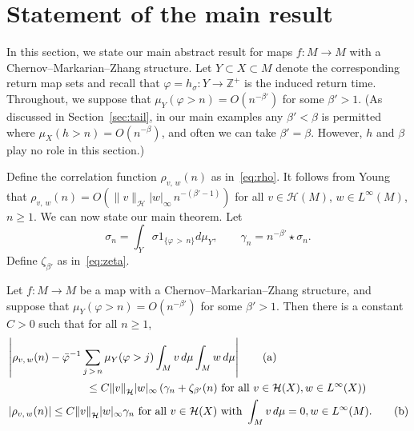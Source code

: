\documentclass[AHL,Unicode,longabstracts,published]{cedram}
\newcommand{\Z}{\mathbb{Z}}
\newcommand{\cH}{\mathcal{H}}
\newcommand{\bvarphi}{\bar{\varphi}}
\newcommand*{\alphenumi}{\renewcommand*{\theenumi}{\alph{enumi}}}
\begin{document}
\section{Statement of the main result}\label{sec:main}

In this section, we state our main abstract result for maps $f:M\to M$ with a Chernov--Markarian--Zhang structure. Let $Y\subset X\subset M$ denote the corresponding return map sets and recall that $\varphi=h_\sigma:Y\to\Z^+$ is the induced return time. Throughout, we suppose that $\mu_Y(\varphi>n)=O(n^{-\beta'})$ for some $\beta'>1$. (As discussed in Section~\ref{sec:tail}, in our main examples any $\beta'<\beta$ is permitted where $\mu_X(h>n)=O(n^{-\beta})$, and often we can take $\beta'=\beta$. However, $h$ and $\beta$ play no role in this section.)



Define the correlation function $\rho_{v,\,w}(n)$ as in~\eqref{eq:rho}. It follows from Young~\cite{Young99} that $\rho_{v,\,w}(n)=O(\|v\|_\cH |w|_\infty\, n^{-(\beta'-1)})$ for all $v\in\cH(M)$, $w\in L^\infty(M)$, $n\ge1$. We can now state our main theorem. Let
\begin{equation}\label{eq:gamma}
 \sigma_n= \int_Y \sigma 1_{\{\varphi\,>\,n\}}d\mu_Y, \qquad
\gamma_n=n^{-\beta'}\star \sigma_n.
\end{equation}
Define $\zeta_{\beta'}$ as in~\eqref{eq:zeta}.

\begin{theo} \label{thm:main}
Let $f:M\to M$ be a map with a Chernov--Markarian--Zhang structure, and suppose that $\mu_Y(\varphi>n)=O(n^{-\beta'})$ for some $\beta'>1$. Then there is a constant $C>0$ such that for all $n\ge1$,
\begin{align}
&\left|\rho_{v,\,w}(n)-\bvarphi^{-1}\sum_{j\,>\,n} \mu_Y(\varphi>j)\int_Mv\,d\mu\int_Mw\,d\mu\right|\tag{${\rm a}$}\label{theo3.1.1}
\\
&\mkern130mu\le C{\|v\|}_{\cH}|w|_\infty\left(\gamma_n+\zeta_{\beta'}(n)\text{ for all }v\in \cH(X), w\in L^\infty(X)\right)\nonumber\\
 &\left|\rho_{v,\,w}(n)\right|\le C{\|v\|}_{\cH}|w|_\infty\gamma_n\text{ for all }v\in \cH(X)\text{ with }\int_M v\,d\mu=0, w\in L^\infty(M).\tag{${\rm b}$}\label{theo3.1.2}
\end{align}
\end{theo}
\end{document}
